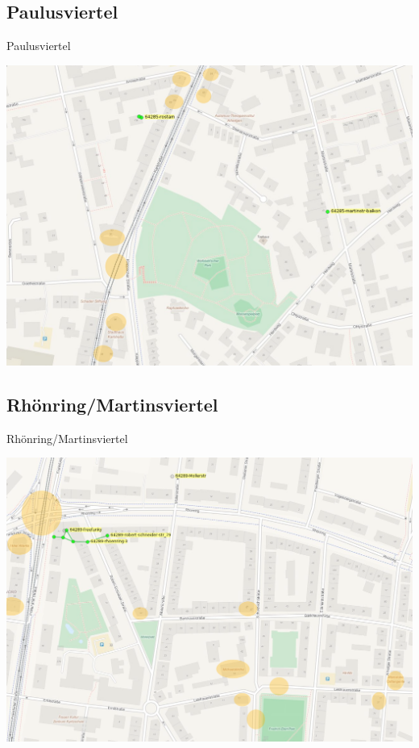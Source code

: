 \documentclass{beamer}
\begin{document}
\subsection{Paulusviertel}
\begin{frame}{Paulusviertel}
\begin{center}
\includegraphics[height=0.8\textheight]{paulusviertel2}
\end{center}
\end{frame}

\subsection{Rhönring/Martinsviertel}
\begin{frame}{Rhönring/Martinsviertel}
\begin{center}
\includegraphics[width=\textwidth]{rhoenring2}
\end{center}
\end{frame}
\end{document}
